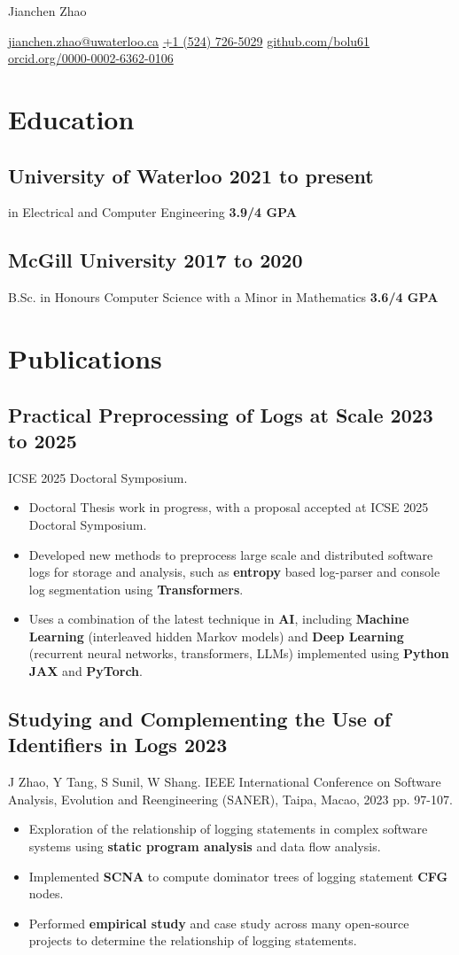 \documentclass[10pt,letterpaper]{article}
\newcommand{\datedsubsection}[2]{\subsection[#1]{#1 \hfill #2}}
\newcommand{\name}[1]{\centerline{\Huge{#1}}}
\newcommand{\contact}[1]{\centerline{#1}}
\newcommand{\sep}{{\large\textperiodcentered}}
\renewcommand{\emph}[1]{{\color{emphcolor}\bfseries#1}}
\begin{document}
\name{Jianchen Zhao}
\contact{\href{mailto:jianchen.zhao@uwaterloo.ca}{jianchen.zhao@uwaterloo.ca} \sep{} \href{tel:+15147265029}{+1 (524) 726-5029} \sep{} \href{https://github.com/bolu61}{github.com/bolu61} \sep{} \href{https://orcid.org/0000-0002-6362-0106}{orcid.org/0000-0002-6362-0106}}

\section{Education}

\datedsubsection{\emph{University of Waterloo}}{2021 to present}
\noindent \emph{Ph.D.} in Electrical and Computer Engineering \emph{3.9/4 GPA}

\datedsubsection{\emph{McGill University}}{2017 to 2020}
\noindent B.Sc. in Honours Computer Science with a Minor in Mathematics \emph{3.6/4 GPA}

\section{Publications}

\datedsubsection{Practical Preprocessing of Logs at Scale}{2023 to 2025}
\noindent ICSE 2025 Doctoral Symposium.
\begin{itemize}
    \item Doctoral Thesis work in progress, with a proposal accepted at ICSE 2025 Doctoral Symposium.
    \item Developed new methods to preprocess large scale and distributed
    software logs for storage and analysis, such as \emph{entropy} based
    log-parser and console log segmentation using \emph{Transformers}.
    \item Uses a combination of the latest technique in \emph{AI}, including
    \emph{Machine Learning} (interleaved hidden Markov models) and \emph{Deep
    Learning} (recurrent neural networks, transformers, LLMs) implemented using
    \emph{Python} \emph{JAX} and \emph{PyTorch}.
\end{itemize}

\datedsubsection{Studying and Complementing the Use of Identifiers in Logs}{2023}
\noindent J Zhao, Y Tang, S Sunil, W Shang. IEEE International Conference on Software Analysis, Evolution and Reengineering (SANER), Taipa, Macao,
2023 pp. 97-107.
\begin{itemize}
    \item Exploration of the relationship of logging statements in complex
    software systems using \emph{static program analysis} and data flow analysis.
    \item Implemented \emph{SCNA} to compute dominator trees of logging statement \emph{CFG} nodes.
    \item Performed \emph{empirical study} and case study across many open-source
    projects to determine the relationship of logging statements.
\end{itemize}
\end{document}
